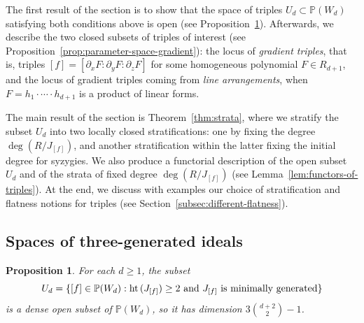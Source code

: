 \documentclass[11pt]{amsart} %
\newtheorem{Proposition}[Theorem]{Proposition}
\theoremstyle{definition}
\def\hht{{\rm ht}\,}
\def\hht{{\rm ht}\,}
\begin{document}
The first result of the section is to show that the space of triples $U_d \subset \mathbb{P}(W_d)$ satisfying both conditions above is open (see Proposition~\ref{prop:parameter-space-open}). Afterwards, we describe the two closed subsets of triples of interest (see Proposition~\ref{prop:parameter-space-gradient}): the locus of \emph{gradient triples}, that is, triples $[f] = [\partial_x F : \partial_y F : \partial_z F]$ for some homogeneous polynomial $F \in R_{d+1}$, and the locus of gradient triples coming from \emph{line arrangements}, when $F = h_1 \cdot \cdots \cdot h_{d+1}$ is a product of linear forms. 

The main result of the section is Theorem~\ref{thm:strata}, where we stratify the subset $U_d$ into two locally closed stratifications: one by fixing the degree $\deg(R/J_{[f]})$, and another stratification within the latter fixing the initial degree for syzygies. We also produce a functorial description of the open subset $U_d$ and of the strata of fixed degree $\deg(R/J_{[f]})$ (see Lemma~\ref{lem:functors-of-triples}). At the end, we discuss with examples our choice of stratification and flatness notions for triples (see Section~\ref{subsec:different-flatness}).

\subsection{Spaces of three-generated ideals}

\begin{Proposition}\label{prop:parameter-space-open}
For each $d \geq 1$, the subset
$$
U_d = \{[f] \in \mathbb{P}(W_d) : \hht(J_{[f]}) \geq 2\text{ and }J_{[f]}\text{ is minimally generated}\}
$$
is a dense open subset of $\mathbb{P}(W_d)$, so it has dimension $3 \binom{d+2}{2}-1$.
\end{Proposition}
\end{document}
